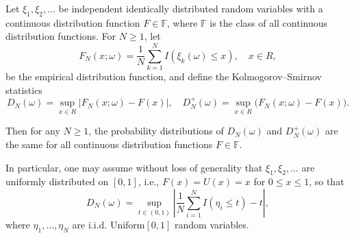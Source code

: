 Let $\xi_1, \xi_2, \ldots$ be independent identically distributed random variables with a continuous distribution function $F \in \mathbb{F}$, where $\mathbb{F}$ is the class of all continuous distribution functions. For $N \geq 1$, let
$$F_N(x; \omega) = \frac{1}{N} \sum_{k=1}^{N} I(\xi_k(\omega) \leq x), \quad x \in R,$$
be the empirical distribution function, and define the Kolmogorov--Smirnov statistics
$$D_N(\omega) = \sup_{x \in R} |F_N(x; \omega) - F(x)|, \quad D_N^+(\omega) = \sup_{x \in R} \big(F_N(x; \omega) - F(x)\big).$$

Then for any $N \geq 1$, the probability distributions of $D_N(\omega)$ and $D_N^+(\omega)$ are the same for all continuous distribution functions $F \in \mathbb{F}$.

In particular, one may assume without loss of generality that $\xi_1, \xi_2, \ldots$ are uniformly distributed on $[0, 1]$, i.e., $F(x) = U(x) = x$ for $0 \leq x \leq 1$, so that
$$D_N(\omega) = \sup_{t \in (0,1)} \left| \frac{1}{N} \sum_{i=1}^{N} I(\eta_i \leq t) - t \right|,$$
where $\eta_1, \ldots, \eta_N$ are i.i.d. $\text{Uniform}[0,1]$ random variables.
